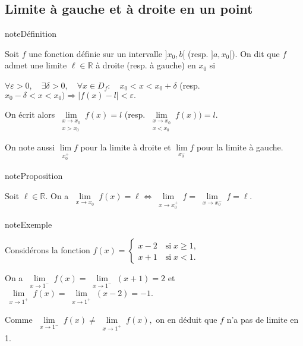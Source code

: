 \documentclass[letterpaper,10pt,french]{jupyterBook}
\begin{document}
\subsection{Limite à gauche et à droite en un point}
\label{\detokenize{limitefcts:limite-a-gauche-et-a-droite-en-un-point}}
\begin{sphinxadmonition}{note}{Définition}

\sphinxAtStartPar
Soit \(f\) une fonction définie sur un intervalle \(]x_0,b[\) (resp. \(]a,x_0[\)). On dit que \(f\) admet une limite \(\ell\in \mathbb{R}\) à droite (resp. à gauche) en \(x_0\) si

\sphinxAtStartPar
\(\forall \varepsilon>0,\quad \exists\delta>0,\quad \forall x\in D_f:\quad x_0< x<x_0+\delta\) (resp. \(x_0-\delta< x< x_0)\Rightarrow |f(x)-l|<\varepsilon.\)

\sphinxAtStartPar
On écrit alors \(\lim\limits_{\substack{x \rightarrow x_0 \\ x>x_0}} f(x)=l\) (resp. \(\lim\limits_{\substack{x \rightarrow x_0 \\ x<x_0}} f(x))=l.\)

\sphinxAtStartPar
On note aussi \(\lim\limits_{\substack{x_{0}^{+}}}f\) pour la limite à droite et \(\lim\limits_{\substack{x_{0}^{-}}}f\) pour la limite à gauche.
\end{sphinxadmonition}

\begin{sphinxadmonition}{note}{Proposition}

\sphinxAtStartPar
Soit \(\ell\in \mathbb{R}.\) On a \(\lim\limits_{\substack{x \rightarrow x_0}}f(x)=\ell\Leftrightarrow \lim\limits_{\substack{x \rightarrow x_{0}^{+}}}f=\lim\limits_{\substack{x \rightarrow x_{0}^{-}}}f=\ell.\)
\end{sphinxadmonition}

\begin{sphinxadmonition}{note}{Exemple}

\sphinxAtStartPar
Considérons la fonction \(f(x)=\left\{
\begin{array}{ll}
x-2 \quad\mbox{si} \;x\geq 1,\\
x+1 \quad\mbox{si}\;x<1.
\end{array}
\right.\)

\sphinxAtStartPar
On a \(\lim\limits_{\substack{x \rightarrow 1^{-}}}f(x)=\lim\limits_{\substack{x \rightarrow 1^{-}}}(x+1)=2\) et \(\lim\limits_{\substack{x \rightarrow 1^{+}}}f(x)=\lim\limits_{\substack{x \rightarrow 1^{+}}}(x-2)=-1.\)

\sphinxAtStartPar
Comme \(\lim\limits_{\substack{x \rightarrow 1^{-}}}f(x)\neq\lim\limits_{\substack{x \rightarrow 1^{+}}}f(x),\) on en déduit que \(f\) n’a pas de limite en 1.
\end{sphinxadmonition}
\end{document}
